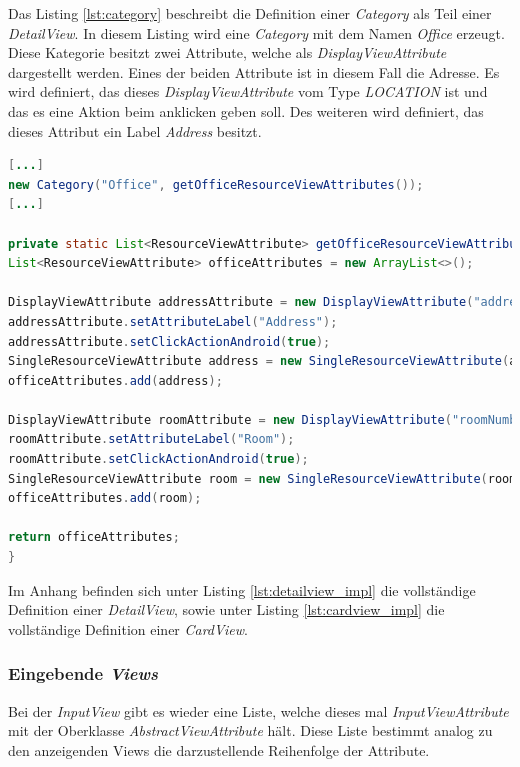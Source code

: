 Das Listing \ref{lst:category} beschreibt die Definition einer \textit{Category} als Teil einer \textit{DetailView}. In diesem Listing wird eine \textit{Category} mit dem Namen \textit{Office} erzeugt. Diese Kategorie besitzt zwei Attribute, welche als \textit{DisplayViewAttribute} dargestellt werden. Eines der beiden Attribute ist in diesem Fall die Adresse. Es wird definiert, das dieses \textit{DisplayViewAttribute} vom Type \textit{LOCATION} ist und das es eine Aktion beim anklicken geben soll. Des weiteren wird definiert, das dieses Attribut ein Label \textit{Address} besitzt.

\begin{lstlisting}[label=lst:category,
language=java,
firstnumber=1,
caption=Erstellung einer \textit{Category}.]		
[...]
new Category("Office", getOfficeResourceViewAttributes());
[...]

private static List<ResourceViewAttribute> getOfficeResourceViewAttributes() {
List<ResourceViewAttribute> officeAttributes = new ArrayList<>();

DisplayViewAttribute addressAttribute = new DisplayViewAttribute("address", ViewAttribute.AttributeType.LOCATION);
addressAttribute.setAttributeLabel("Address");
addressAttribute.setClickActionAndroid(true);
SingleResourceViewAttribute address = new SingleResourceViewAttribute(addressAttribute);
officeAttributes.add(address);

DisplayViewAttribute roomAttribute = new DisplayViewAttribute("roomNumber", ViewAttribute.AttributeType.TEXT);
roomAttribute.setAttributeLabel("Room");
roomAttribute.setClickActionAndroid(true);
SingleResourceViewAttribute room = new SingleResourceViewAttribute(roomAttribute);
officeAttributes.add(room);

return officeAttributes;
}
\end{lstlisting}

Im Anhang befinden sich unter Listing \ref{lst:detailview_impl} die vollständige Definition einer \textit{DetailView}, sowie unter Listing \ref{lst:cardview_impl} die vollständige Definition einer \textit{CardView}. 

\subsubsection{Eingebende \textit{Views}}

Bei der \textit{InputView} gibt es wieder eine Liste, welche dieses mal \textit{InputViewAttribute} mit der Oberklasse \textit{AbstractViewAttribute} hält. Diese Liste bestimmt analog zu den anzeigenden Views die darzustellende Reihenfolge der Attribute. 

